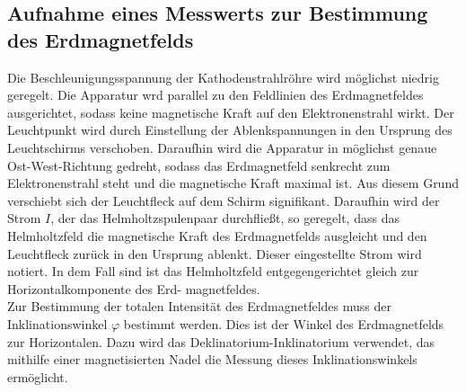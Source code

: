 \subsection{Aufnahme eines Messwerts zur Bestimmung des Erdmagnetfelds}
\label{subsec:brauchtniemand}
Die Beschleunigungsspannung der Kathodenstrahlröhre wird möglichst niedrig geregelt.
Die Apparatur wrd parallel zu den Feldlinien des Erdmagnetfeldes ausgerichtet, sodass
keine magnetische Kraft auf den Elektronenstrahl wirkt. Der Leuchtpunkt wird durch
Einstellung der Ablenkspannungen in den Ursprung des Leuchtschirms verschoben.
Daraufhin wird die Apparatur in möglichst genaue Ost-West-Richtung gedreht, sodass
das Erdmagnetfeld senkrecht zum Elektronenstrahl steht und die magnetische Kraft maximal
ist. Aus diesem Grund verschiebt sich der Leuchtfleck auf dem Schirm signifikant.
Daraufhin wird der Strom $I$, der das Helmholtzspulenpaar durchfließt, so geregelt, dass
das Helmholtzfeld die magnetische Kraft des Erdmagnetfelds ausgleicht und den Leuchtfleck
zurück in den Ursprung ablenkt. Dieser eingestellte Strom wird notiert. In dem Fall
sind ist das Helmholtzfeld entgegengerichtet gleich zur Horizontalkomponente des Erd-
magnetfeldes.
\\
Zur Bestimmung der totalen Intensität des Erdmagnetfeldes muss der Inklinationswinkel
$\varphi$ bestimmt werden. Dies ist der Winkel des Erdmagnetfelds zur Horizontalen.
Dazu wird das Deklinatorium-Inklinatorium verwendet, das mithilfe einer magnetisierten
Nadel die Messung dieses Inklinationswinkels ermöglicht.
